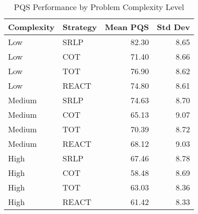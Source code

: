 \begin{table}[htbp]
\centering
\caption{PQS Performance by Problem Complexity Level}
\label{tab:pqs_by_complexity}
\begin{tabular}{llrr}
\toprule
Complexity & Strategy & Mean PQS & Std Dev \\
\midrule
Low & SRLP & 82.30 & 8.65 \\
Low & COT & 71.40 & 8.66 \\
Low & TOT & 76.90 & 8.62 \\
Low & REACT & 74.80 & 8.61 \\
Medium & SRLP & 74.63 & 8.70 \\
Medium & COT & 65.13 & 9.07 \\
Medium & TOT & 70.39 & 8.72 \\
Medium & REACT & 68.12 & 9.03 \\
High & SRLP & 67.46 & 8.78 \\
High & COT & 58.48 & 8.69 \\
High & TOT & 63.03 & 8.36 \\
High & REACT & 61.42 & 8.33 \\
\bottomrule
\end{tabular}
\end{table}